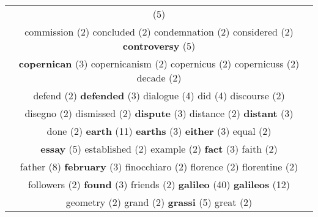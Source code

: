 \documentclass[12pt,a4paper]{article}
\begin{document}
\begin{center}
\begin{tabular}{|c|}
\footnotesize{(5)}  \\ {\footnotesize \textcolor{Verde} {commission}} \footnotesize{(2)} {\footnotesize \textcolor{Verde} {concluded}} \footnotesize{(2)} {\footnotesize \textcolor{Verde} {condemnation}} \footnotesize{(2)} {\footnotesize \textcolor{Verde} {considered}} \footnotesize{(2)} {\large \textcolor{Roxo} {\bf controversy}} \footnotesize{(5)}  \\ {\small \textcolor{Laranja} {\bf copernican}} \footnotesize{(3)} {\footnotesize \textcolor{Verde} {copernicanism}} \footnotesize{(2)} {\footnotesize \textcolor{Verde} {copernicus}} \footnotesize{(2)} {\footnotesize \textcolor{Verde} {copernicuss}} \footnotesize{(2)} {\footnotesize \textcolor{Verde} {decade}} \footnotesize{(2)}  \\ {\footnotesize \textcolor{Verde} {defend}} \footnotesize{(2)} {\small \textcolor{Laranja} {\bf defended}} \footnotesize{(3)} {\normalsize \textcolor{VerdeLocao} {dialogue}} \footnotesize{(4)} {\normalsize \textcolor{VerdeLocao} {did}} \footnotesize{(4)} {\footnotesize \textcolor{Verde} {discourse}} \footnotesize{(2)}  \\ {\footnotesize \textcolor{Verde} {disegno}} \footnotesize{(2)} {\footnotesize \textcolor{Verde} {dismissed}} \footnotesize{(2)} {\small \textcolor{Laranja} {\bf dispute}} \footnotesize{(3)} {\footnotesize \textcolor{Verde} {distance}} \footnotesize{(2)} {\small \textcolor{Laranja} {\bf distant}} \footnotesize{(3)}  \\ {\footnotesize \textcolor{Verde} {done}} \footnotesize{(2)} {\Huge \textcolor{AzulEscuro} {\bf earth}} \footnotesize{(11)} {\small \textcolor{Laranja} {\bf earths}} \footnotesize{(3)} {\small \textcolor{Laranja} {\bf either}} \footnotesize{(3)} {\footnotesize \textcolor{Verde} {equal}} \footnotesize{(2)}  \\ {\large \textcolor{Roxo} {\bf essay}} \footnotesize{(5)} {\footnotesize \textcolor{Verde} {established}} \footnotesize{(2)} {\footnotesize \textcolor{Verde} {example}} \footnotesize{(2)} {\small \textcolor{Laranja} {\bf fact}} \footnotesize{(3)} {\footnotesize \textcolor{Verde} {faith}} \footnotesize{(2)}  \\ {\huge \textcolor{Amarelo} {father}} \footnotesize{(8)} {\small \textcolor{Laranja} {\bf february}} \footnotesize{(3)} {\footnotesize \textcolor{Verde} {finocchiaro}} \footnotesize{(2)} {\footnotesize \textcolor{Verde} {florence}} \footnotesize{(2)} {\footnotesize \textcolor{Verde} {florentine}} \footnotesize{(2)}  \\ {\footnotesize \textcolor{Verde} {followers}} \footnotesize{(2)} {\small \textcolor{Laranja} {\bf found}} \footnotesize{(3)} {\footnotesize \textcolor{Verde} {friends}} \footnotesize{(2)} {\Huge \textcolor{AzulEscuro} {\bf galileo}} \footnotesize{(40)} {\Huge \textcolor{AzulEscuro} {\bf galileos}} \footnotesize{(12)}  \\ {\footnotesize \textcolor{Verde} {geometry}} \footnotesize{(2)} {\footnotesize \textcolor{Verde} {grand}} \footnotesize{(2)} {\large \textcolor{Roxo} {\bf grassi}} \footnotesize{(5)} {\footnotesize \textcolor{Verde} {great}} \footnotesize{(2)} {\footnotesize 
\end{tabular}
\end{center}
\end{document}
